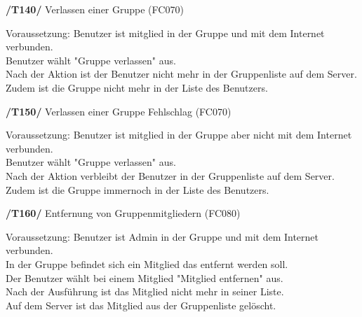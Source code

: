 \textbf{/T140/} Verlassen einer Gruppe (FC070)\\
\begin{center}
\vspace{-\parskip}
\begin{minipage}[t]{0.9\textwidth}
Voraussetzung: Benutzer ist mitglied in der Gruppe und mit dem Internet verbunden.\\
Benutzer wählt "Gruppe verlassen" aus.\\
Nach der Aktion ist der Benutzer nicht mehr in der Gruppenliste auf dem Server.\\
Zudem ist die Gruppe nicht mehr in der Liste des Benutzers.\\
\end{minipage}
\end{center}

\textbf{/T150/} Verlassen einer Gruppe Fehlschlag (FC070)\\
\begin{center}
\vspace{-\parskip}
\begin{minipage}[t]{0.9\textwidth}
Voraussetzung: Benutzer ist mitglied in der Gruppe aber nicht mit dem Internet verbunden.\\
Benutzer wählt "Gruppe verlassen" aus.\\
Nach der Aktion verbleibt der Benutzer in der Gruppenliste auf dem Server.\\
Zudem ist die Gruppe immernoch in der Liste des Benutzers.\\
\end{minipage}
\end{center}

\textbf{/T160/} Entfernung von Gruppenmitgliedern (FC080)\\
\begin{center}
\vspace{-\parskip}
\begin{minipage}[t]{0.9\textwidth}
Voraussetzung: Benutzer ist Admin in der Gruppe und mit dem Internet verbunden.\\
In der Gruppe befindet sich ein Mitglied das entfernt werden soll.              \\
Der Benutzer wählt bei einem Mitglied "Mitglied entfernen" aus.                  \\
Nach der Ausführung ist das Mitglied nicht mehr in seiner Liste.                 \\
Auf dem Server ist das Mitglied aus der Gruppenliste gelöscht.                    \\
\end{minipage}
\end{center}

